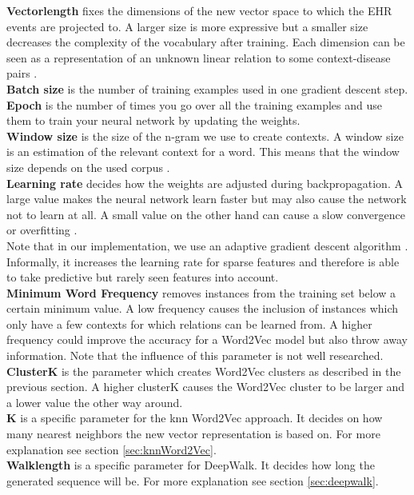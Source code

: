 \noindent\textbf{Vectorlength} fixes the dimensions of the new vector space to which the EHR events are projected to. A larger size is more expressive but a smaller size decreases the complexity of the vocabulary after training. Each dimension can be seen as a representation of an unknown linear relation to some context-disease pairs \cite{vl:article}. \\
\textbf{Batch size} is the number of training examples used in one gradient descent step. \\
\textbf{Epoch} is the number of times you go over all the training examples and use them to train your neural network by updating the weights. \\
\textbf{Window size} is the size of the n-gram we use to create contexts. A window size is an estimation of the relevant context for a word. This means that the window size depends on the used corpus \cite{w2vOriginal:article} \cite{windowSize:article}. \\
\textbf{Learning rate} decides how the weights are adjusted during backpropagation. A large value makes the neural network learn faster but may also cause the network not to learn at all. A small value on the other hand can cause a slow convergence or overfitting \cite{lr:article}. \\
Note that in our implementation, we use an adaptive gradient descent algorithm \cite{adagrad:article}. Informally, it increases the learning rate for sparse features and therefore is able to take predictive but rarely seen features into account.  \\
\textbf{Minimum Word Frequency} removes instances from the training set below a certain minimum value. A low frequency causes the inclusion of instances which only have a few contexts for which relations can be learned from. A higher frequency could improve the accuracy for a Word2Vec model but also throw away information. Note that the influence of this parameter is not well researched. \\
\textbf{ClusterK} is the parameter which creates Word2Vec clusters as described in the previous section. A higher clusterK causes the Word2Vec cluster to be larger and a lower value the other way around. \\
\textbf{K} is a specific parameter for the knn Word2Vec approach. It decides on how many nearest neighbors the new vector representation is based on. For more explanation see section \ref{sec:knnWord2Vec}. \\
\textbf{Walklength} is a specific parameter for DeepWalk. It decides how long the generated sequence will be. For more explanation see section \ref{sec:deepwalk}.

